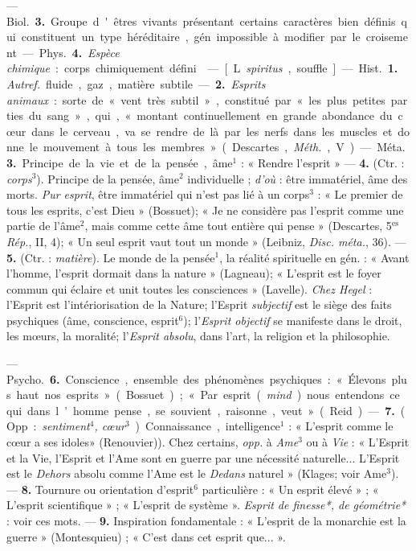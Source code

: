 \begin{itemize}[leftmargin=1cm, label=, itemsep=1pt]
— \si{Biol.} {\bf 3.} Groupe d'êtres vivants
présentant certains caractères bien
définis qui constituent un type
héréditaire, gén. impossible à modifier par le croisement.

— \si{Phys.} {\bf 4.} {\it Espèce chimique} :
corps chimiquement défini.

 — [L. {\it spiritus}, souffle] — \si{Hist.}
{\bf 1.} {\it Autref.} fluide, gaz, matière
subtile. — {\bf 2.} {\it Esprits animaux} : sorte
de « vent très subtil », constitué
par « les plus petites parties du
sang », qui, « montant continuellement en grande abondance du
cœur dans le cerveau, va se rendre
de là par les nerfs dans les muscles
et donne le mouvement à tous les
membres » (Descartes, {\it Méth.}, V).

— \si{Méta.} {\bf 3.} Principe de la vie et de
la pensée, âme$^1$ : « Rendre l'esprit »
— {\bf 4.} (Ctr. : {\it corps}$^3$). Principe de la
pensée, âme$^2$ individuelle ; {\it d'où} :
être immatériel, âme des morts.
{\it Pur esprit}, être immatériel qui n’est
pas lié à un corps$^3$ : « Le premier de
tous les esprits, c’est Dieu » (Bossuet); « Je ne considère pas l'esprit
comme une partie de l'âme$^2$, mais
comme cette âme tout entière qui
pense » (Descartes, 5$^\text{es}$ {\it Rép.}, II, 4);
« Un seul esprit vaut tout un monde »
(Leibniz, {\it Disc. méta.}, 36). — {\bf 5.} (Ctr. :
{\it matière}). Le monde de la pensée$^1$, la
réalité spirituelle en gén. : « Avant
l’homme, l'esprit dormait dans la
nature » (Lagneau); « L'esprit est
le foyer commun qui éclaire et unit
toutes les consciences » (Lavelle).
{\it Chez Hegel} : l'Esprit est l’intériorisation
de la Nature; l'Esprit {\it subjectif} est le siège des faits psychiques
(âme, conscience, esprit$^6$); l'{\it Esprit objectif} se manifeste
dans le droit, les mœurs, la moralité; l'{\it Esprit absolu}, dans l’art,
la religion et la philosophie.

— \si{Psycho.} {\bf 6.} Conscience, ensemble des phénomènes psychiques :
« Élevons plus haut nos esprits »
(Bossuet); « Par esprit ({\it mind}) nous
entendons ce qui dans l’homme
pense, se souvient, raisonne, veut »
(Reid). — {\bf 7.} (Opp. : {\it sentiment$^4$,
cœur$^3$}). Connaissance, intelligence$^1$ :
« L'esprit comme le cœur a ses idoles»
(Renouvier)). Chez certains, {\it opp.} à
{\it Ame}$^3$ ou à {\it Vie} : « L'Esprit et la Vie,
l'Esprit et l'Ame sont en guerre par
une nécessité naturelle... L'Esprit
est le {\it Dehors} absolu comme l’Ame
est le {\it Dedans} naturel » (Klages;
voir Ame$^3$). — {\bf 8.} Tournure ou orientation d’esprit$^6$
particulière : « Un esprit élevé » ; « L'esprit scientifique » ;
« L'esprit de système ». {\it Esprit de finesse*, de géométrie*} :
voir ces mots. — {\bf 9.} Inspiration fondamentale : « L’esprit de la
monarchie est la guerre » (Montesquieu) ; « C’est dans cet esprit que... ».


\end{itemize}
